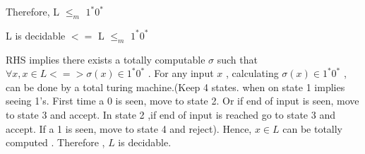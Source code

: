 \documentclass[addpoints,12pt]{exam}
\begin{document}
\begin{questions}
\begin{parts}
  Therefore, L $\leq_{m}$ $1^\ast0^\ast$ \newline
  
  L is decidable $<=$ L $\leq_{m}$ $1^\ast0^\ast$ \newline
   
    RHS implies there exists a totally computable $\sigma$ such that $\forall x, x\in L <=> \sigma(x)\in1^\ast0^\ast$ . \newline
    For any input $x$ , calculating $\sigma(x)\in1^\ast0^\ast$ , can be done by a total turing machine.(Keep 4 states. when on state 1 implies seeing 1's. First time a 0 is seen,
    move to state 2. Or if end of input is seen, move to state 3 and accept. In state 2 ,if end of input is reached go to state 3 and accept. If a 1 is seen, move to state 4 and reject).
    Hence, $x\in L$ can be totally computed . Therefore , $L$ is decidable.
   
 \end{parts}

 
 
 \question
 
 
 
 \end{questions}
\end{document}
